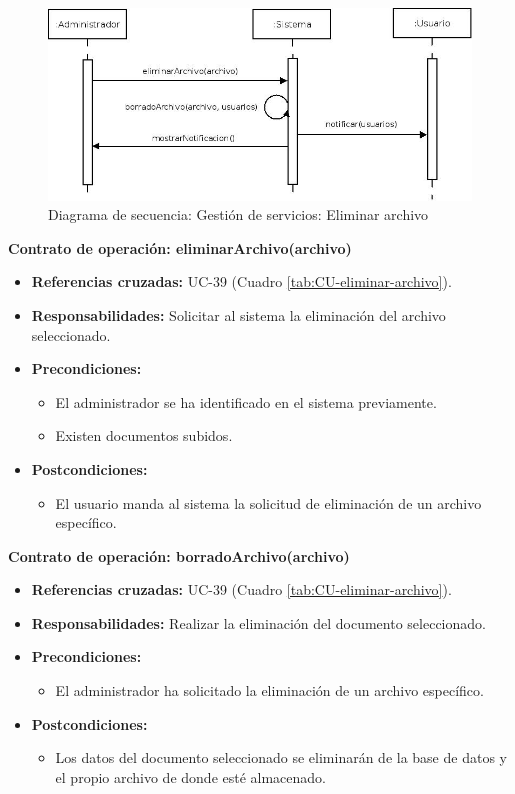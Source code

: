 \begin{figure}[H]
\centering
  \includegraphics[scale=.50]{img/secuencias/gestion-servicios-eliminar-archivo.jpeg}
  \caption{Diagrama de secuencia: Gestión de servicios: Eliminar archivo}
  \label{fig:secuencia-gestion-servicios-eliminar-archivo}
\end{figure}

\textbf{Contrato de operación: eliminarArchivo(archivo)}
\begin{itemize}
\item \textbf{Referencias cruzadas:} UC-39 (Cuadro \ref{tab:CU-eliminar-archivo}).
\item \textbf{Responsabilidades:} Solicitar al sistema la eliminación del archivo seleccionado.
\item \textbf{Precondiciones:} 
 \begin{itemize}
\item El administrador se ha identificado en el sistema previamente.
\item Existen documentos subidos.
\end {itemize}
\item \textbf{Postcondiciones:} 
 \begin{itemize}
\item El usuario manda al sistema la solicitud de eliminación de un archivo específico.
\end {itemize}
\end {itemize}

\textbf{Contrato de operación: borradoArchivo(archivo)}
\begin{itemize}
\item \textbf{Referencias cruzadas:} UC-39 (Cuadro \ref{tab:CU-eliminar-archivo}).
\item \textbf{Responsabilidades:} Realizar la eliminación del documento seleccionado.
\item \textbf{Precondiciones:} 
 \begin{itemize}
\item El administrador ha solicitado la eliminación de un archivo específico.
\end {itemize}
\item \textbf{Postcondiciones:} 
 \begin{itemize}
\item Los datos del documento seleccionado se eliminarán de la base de datos y el propio archivo de donde esté almacenado.
\end {itemize}
\end {itemize}

